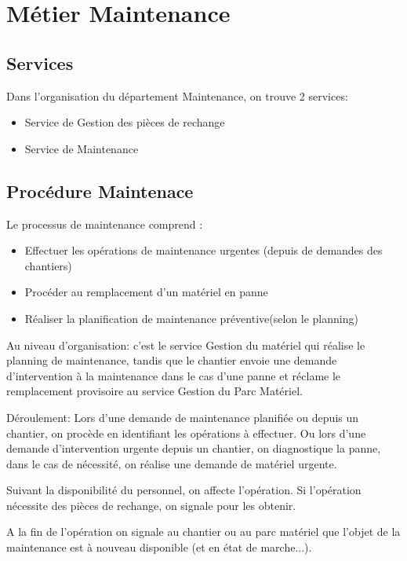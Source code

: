 \section{Métier Maintenance}
\subsection{Services}
Dans l'organisation du département Maintenance, on trouve 2 services:
\begin{itemize}
    \item Service de Gestion des pièces de rechange
    \item Service de Maintenance
\end{itemize}

\subsection{Procédure Maintenace}

Le processus de maintenance comprend :
\begin{itemize}
    \item Effectuer les opérations de maintenance urgentes (depuis de demandes des chantiers)
    \item Procéder au remplacement d'un matériel en panne 
    \item Réaliser la planification de maintenance préventive(selon le planning)
\end{itemize}

Au niveau d'organisation: c'est le service Gestion du matériel qui réalise le planning de maintenance, tandis que le chantier envoie une demande d'intervention à la maintenance dans le cas d'une panne et réclame le remplacement provisoire au service Gestion du Parc Matériel. 


Déroulement: Lors d'une demande de maintenance planifiée ou  depuis un chantier, on procède en identifiant les opérations à effectuer. Ou lors d'une demande d'intervention urgente depuis un chantier, on diagnostique la panne, dans le cas de nécessité, on réalise une demande de matériel urgente.


Suivant la disponibilité du personnel, on affecte l'opération. Si l'opération nécessite des pièces de rechange, on signale pour les obtenir.


A la fin de l'opération on signale au chantier ou au parc matériel que l'objet de la maintenance est à nouveau disponible (et en état de marche...).



